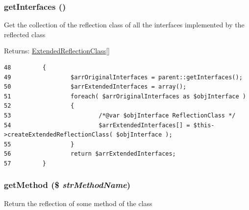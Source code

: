 \hypertarget{class_extended_reflection_class_acd41ad982fee4953d8ad245ab7e4ec9}{
\subsubsection[{getInterfaces}]{\setlength{\rightskip}{0pt plus 5cm}getInterfaces ()}}
\label{class_extended_reflection_class_acd41ad982fee4953d8ad245ab7e4ec9}


Get the collection of the reflection class of all the interfaces implemented by the reflected class

\begin{Desc}
\item[Returns:]\hyperlink{class_extended_reflection_class}{ExtendedReflectionClass}\mbox{[}\mbox{]} \end{Desc}


\begin{Code}\begin{verbatim}48         {
49                 $arrOriginalInterfaces = parent::getInterfaces();
50                 $arrExtendedInterfaces = array();
51                 foreach( $arrOriginalInterfaces as $objInterface )
52                 {
53                         /*@var $objInterface ReflectionClass */
54                         $arrExtendedInterfaces[] = $this->createExtendedReflectionClass( $objInterface );
55                 }
56                 return $arrExtendedInterfaces;
57         }
\end{verbatim}
\end{Code}


\hypertarget{class_extended_reflection_class_c569f5e42707c39d576fc5cda820d233}{
\subsubsection[{getMethod}]{\setlength{\rightskip}{0pt plus 5cm}getMethod (\$ {\em strMethodName})}}
\label{class_extended_reflection_class_c569f5e42707c39d576fc5cda820d233}


Return the reflection of some method of the class

